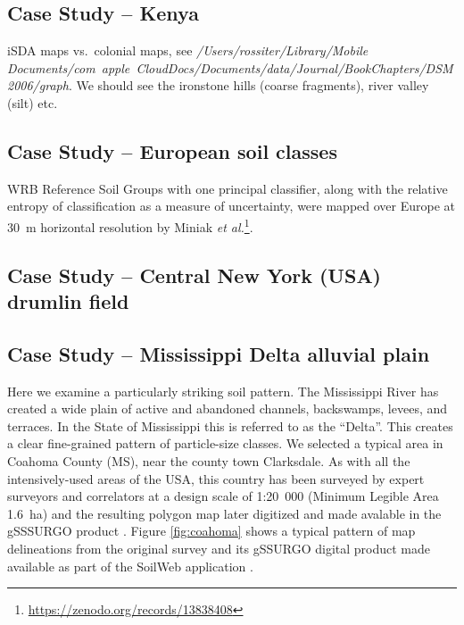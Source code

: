\documentclass[soil, manuscript]{copernicus}
\begin{document}
\subsection{Case Study -- Kenya}

iSDA maps vs.\ colonial maps, see \emph{/Users/rossiter/Library/Mobile Documents/com~apple~CloudDocs/Documents/data/Journal/BookChapters/DSM2006/graph}. We should see the ironstone hills (coarse fragments), river valley (silt) etc.

\subsection{Case Study -- European soil classes}

WRB Reference Soil Groups with one principal classifier, along with the relative entropy of classification as a measure of uncertainty, were mapped over Europe at 30~m horizontal resolution by  Miniak \emph{et al.}\footnote{\url{https://zenodo.org/records/13838408}}.


\subsection{Case Study -- Central New York (USA) drumlin field}

\citep{naumanSoilLandscapesUnited2024}

\subsection{Case Study -- Mississippi Delta alluvial plain}

\par
Here we examine a particularly striking soil pattern.
%
The Mississippi River has created a wide plain of active and abandoned channels, backswamps, levees, and terraces.
%
In the State of Mississippi this is referred to as the ``Delta''.
%
This creates a clear fine-grained pattern of particle-size classes.
%
We selected a typical area in Coahoma County (MS), near the county town Clarksdale.
%
As with all the intensively-used areas of the USA, this country has been surveyed by expert surveyors and correlators  \citep{unitedstates.naturalresourcesconservationserviceSoilSurveyCoahoma1959} at a design scale of 1:20~000 (Minimum Legible Area 1.6~ha) and the resulting polygon map later digitized and made avalable in the gSSSURGO product \citep{nrcssoilsDescriptionGriddedSoil2022}.
%
Figure \ref{fig:coahoma} shows a typical pattern of map delineations from the original survey and its gSSURGO digital product made available as part of the SoilWeb application \citep{californiasoilresourcelabSoilWebApps, OGeenSoilWebMultifacetedInterface2017}.
\end{document}

